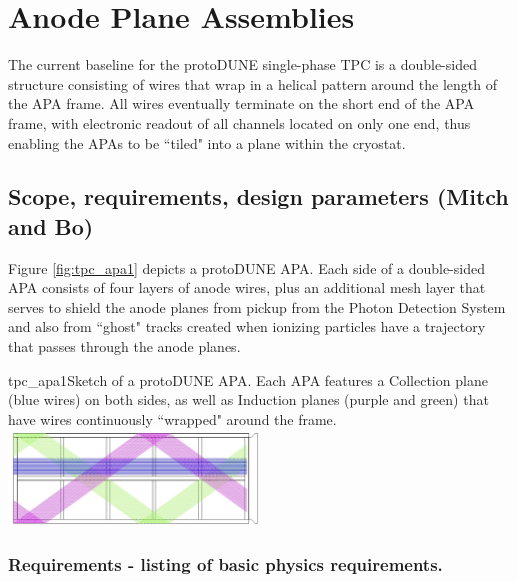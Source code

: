 

\section{Anode Plane Assemblies}

The current baseline for the protoDUNE single-phase TPC is a double-sided structure consisting of wires that wrap in a helical pattern around the length of the APA frame.  All wires eventually terminate on the short end of the APA frame, with electronic readout of all channels located on only one end, thus enabling the APAs to be ``tiled" into a plane within the cryostat.  



\subsection{Scope, requirements, design parameters (Mitch and Bo)}

Figure \ref{fig:tpc_apa1} depicts a protoDUNE APA.  Each side of a double-sided APA consists of four layers of anode wires, plus an additional mesh layer that serves to shield the anode planes from pickup from the Photon Detection System and also from ``ghost" tracks created when ionizing particles have a trajectory that passes through the anode planes.  

\begin{cdrfigure}{tpc_apa1}{Sketch of a protoDUNE APA.  Each APA features a Collection plane (blue wires) on both sides, as well as Induction planes (purple and green) that have wires continuously ``wrapped" around the frame.}
\includegraphics[width=0.5\textwidth, angle=90]{figures/tpc_apa1.jpg} 
\end{cdrfigure}

\subsubsection{Requirements - listing of basic physics requirements.}

